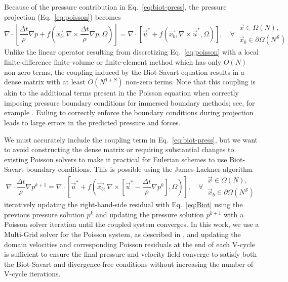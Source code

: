 \documentclass[final,1p,times]{elsarticle}
\begin{document}
Because of the pressure contribution in Eq.~\ref{eq:biot-press}, the pressure projection (Eq.~\ref{eq:poisson}) becomes
\begin{equation}\label{eq:complex_poisson}
    \nabla\cdot\left[\frac{\Delta t}{\rho}\nabla p + f\left(\vec{x_b},\nabla\times\frac{\Delta t}{\rho}\nabla p,\Omega\right)\right] = \nabla\cdot\left[ \vec{u}^* + f(\vec{x_b},\nabla\times\vec{u}^*,\Omega)\right], \quad\forall\
    \begin{array}{l}
    \vec{x} \in \Omega(N),\\
    \vec{x}_b \in \partial\Omega(N^\mathcal{S})
    \end{array}
\end{equation}
Unlike the linear operator resulting from discretizing Eq.~\ref{eq:poisson} with a local finite-difference finite-volume or finite-element method which has only $O(N)$ non-zero terms, the coupling induced by the Biot-Savart equation results in a dense matrix with at least $O(N^{1+S})$ non-zero terms. Note that this coupling is akin to the additional terms present in the Poisson equation when correctly imposing pressure boundary conditions for immersed boundary methods; see, for example \cite{Taira2007, Lauber2022}. Failing to correctly enforce the boundary conditions during projection leads to large errors in the predicted pressure and forces.

We must accurately include the coupling term in Eq.~\ref{eq:biot-press}, but we want to avoid constructing the dense matrix or requiring substantial changes to existing Poisson solvers to make it practical for Eulerian schemes to use Biot-Savart boundary conditions. This is possible using the James-Lackner algorithm \cite{Jamb1977TheDistributions, Miller2008AnBoundaries}
\begin{equation}\label{eq:differed_poisson}
    \nabla\cdot\frac{\Delta t}{\rho}\nabla p^{k+1} = \nabla\cdot\left[ \vec{u}^* + f\left(\vec{x_b},\nabla\times\left[\vec{u}^*-\frac{\Delta t}{\rho}\nabla p^k\right],\Omega\right)\right], \quad\forall\
    \begin{array}{l}
    \vec{x} \in \Omega(N),\\
    \vec{x}_b \in \partial\Omega(N^\mathcal{S})
    \end{array}
\end{equation}
iteratively updating the right-hand-side residual with Eq.~\ref{eq:Biot} using the previous pressure solution $p^k$ and updating the pressure solution $p^{k+1}$ with a Poisson solver iteration until the coupled system converges. In this work, we use a Multi-Grid solver for the Poisson system, as described in \cite{Weymouth2022Data-drivenProjection}, and updating the domain velocities and corresponding Poisson residuals at the end of each V-cycle is sufficient to ensure the final pressure and velocity field converge to satisfy both the Biot-Savart and divergence-free conditions without increasing the number of V-cycle iterations. 
\end{document}
